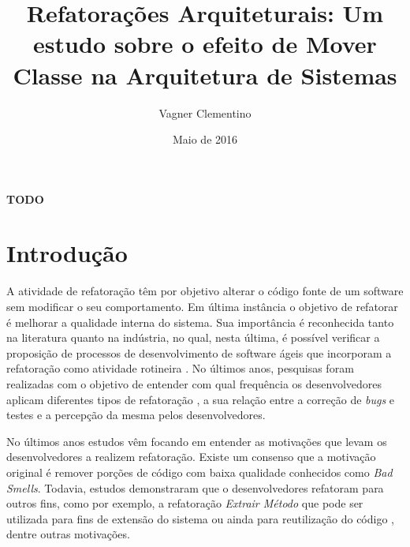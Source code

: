 \documentclass[12pt]{article}
\title{Refatorações Arquiteturais: Um estudo sobre o efeito de Mover Classe na Arquitetura de Sistemas}
\author{Vagner Clementino\inst{1}}
\date{Maio de 2016}
\begin{document}
\maketitle


\begin{resumo}
 \textbf{TODO}
\end{resumo}


\section{Introdução}
\label{sec:intro}

A atividade de refatoração têm por objetivo alterar o código fonte de um software sem modificar o seu comportamento. Em última instância o objetivo de refatorar é melhorar a qualidade interna do sistema\cite{1999:RID:311424,Opdyke:1992:ROF:169783}. Sua importância é reconhecida tanto na literatura quanto na indústria, no qual, nesta última, é possível verificar a proposição de processos de desenvolvimento de software ágeis que incorporam a refatoração como atividade rotineira \cite{Beck:2000:PEP:557458}. No últimos anos, pesquisas foram realizadas com o objetivo de entender com qual frequência os desenvolvedores aplicam diferentes tipos de refatoração \cite{Murphy-Hill:2009:WRW:1555001.1555044}, a sua relação entre a correção de \textit{bugs}\cite{Kim:2011:EIR:1985793.1985815} e testes \cite{Kim:2012:EII:2473496.2473590} e a percepção da mesma pelos desenvolvedores\cite{Kim:2012:FSR:2393596.2393655}.

No últimos anos estudos vêm focando em entender as motivações que levam os desenvolvedores a realizem refatoração. Existe um consenso que a motivação original é remover porções de código com baixa qualidade conhecidos como \textit{Bad Smells}\cite{1999:RID:311424}. Todavia, estudos demonstraram que o desenvolvedores refatoram para outros fins, como por exemplo, a refatoração \textit{Extrair Método} que pode ser utilizada para fins de extensão do sistema \cite{Tsantalis2013}ou ainda para reutilização do código \cite{Danilo}, dentre outras motivações.
\end{document}
